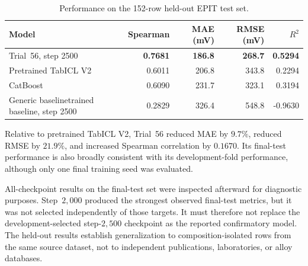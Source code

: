 \documentclass{article}
\begin{document}
\begin{table}[htbp]
\centering
\caption{Performance on the 152-row held-out EPIT test set.}
\label{tab:v7-final-results}
\begin{tabular}{lrrrr}
\hline
Model & Spearman & MAE (mV) & RMSE (mV) & \(R^2\) \\
\hline
Trial~56, step 2500 & \textbf{0.7681} & \textbf{186.8}
                    & \textbf{268.7} & \textbf{0.5294} \\
Pretrained TabICL V2 & 0.6011 & 206.8 & 343.8 & 0.2294 \\
CatBoost              & 0.6090 & 231.7 & 323.1 & 0.3194 \\
Generic baselinetrained baseline, step 2500
                      & 0.2829 & 326.4 & 548.8 & -0.9630 \\
\hline
\end{tabular}
\end{table}

Relative to pretrained TabICL V2, Trial~56 reduced MAE by \(9.7\%\), reduced
RMSE by \(21.9\%\), and increased Spearman correlation by \(0.1670\).
Its final-test performance is also broadly consistent with its development-fold
performance, although only one final training seed was evaluated.

All-checkpoint results on the final-test set were inspected afterward for
diagnostic purposes. Step~\(2{,}000\) produced the strongest observed
final-test metrics, but it was not selected independently of those targets.
It must therefore not replace the development-selected step-\(2{,}500\)
checkpoint as the reported confirmatory model. The held-out results establish
generalization to composition-isolated rows from the same source dataset, not
to independent publications, laboratories, or alloy databases.
\end{document}
